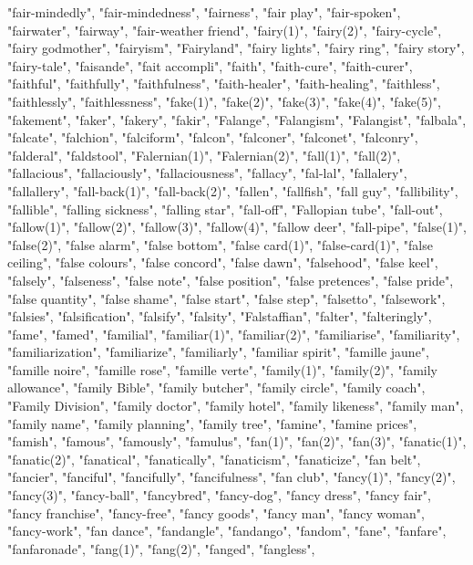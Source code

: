 "fair-mindedly",
"fair-mindedness",
"fairness",
"fair play",
"fair-spoken",
"fairwater",
"fairway",
"fair-weather friend",
"fairy(1)",
"fairy(2)",
"fairy-cycle",
"fairy godmother",
"fairyism",
"Fairyland",
"fairy lights",
"fairy ring",
"fairy story",
"fairy-tale",
"faisande",
"fait accompli",
"faith",
"faith-cure",
"faith-curer",
"faithful",
"faithfully",
"faithfulness",
"faith-healer",
"faith-healing",
"faithless",
"faithlessly",
"faithlessness",
"fake(1)",
"fake(2)",
"fake(3)",
"fake(4)",
"fake(5)",
"fakement",
"faker",
"fakery",
"fakir",
"Falange",
"Falangism",
"Falangist",
"falbala",
"falcate",
"falchion",
"falciform",
"falcon",
"falconer",
"falconet",
"falconry",
"falderal",
"faldstool",
"Falernian(1)",
"Falernian(2)",
"fall(1)",
"fall(2)",
"fallacious",
"fallaciously",
"fallaciousness",
"fallacy",
"fal-lal",
"fallalery",
"fallallery",
"fall-back(1)",
"fall-back(2)",
"fallen",
"fallfish",
"fall guy",
"fallibility",
"fallible",
"falling sickness",
"falling star",
"fall-off",
"Fallopian tube",
"fall-out",
"fallow(1)",
"fallow(2)",
"fallow(3)",
"fallow(4)",
"fallow deer",
"fall-pipe",
"false(1)",
"false(2)",
"false alarm",
"false bottom",
"false card(1)",
"false-card(1)",
"false ceiling",
"false colours",
"false concord",
"false dawn",
"falsehood",
"false keel",
"falsely",
"falseness",
"false note",
"false position",
"false pretences",
"false pride",
"false quantity",
"false shame",
"false start",
"false step",
"falsetto",
"falsework",
"falsies",
"falsification",
"falsify",
"falsity",
"Falstaffian",
"falter",
"falteringly",
"fame",
"famed",
"familial",
"familiar(1)",
"familiar(2)",
"familiarise",
"familiarity",
"familiarization",
"familiarize",
"familiarly",
"familiar spirit",
"famille jaune",
"famille noire",
"famille rose",
"famille verte",
"family(1)",
"family(2)",
"family allowance",
"family Bible",
"family butcher",
"family circle",
"family coach",
"Family Division",
"family doctor",
"family hotel",
"family likeness",
"family man",
"family name",
"family planning",
"family tree",
"famine",
"famine prices",
"famish",
"famous",
"famously",
"famulus",
"fan(1)",
"fan(2)",
"fan(3)",
"fanatic(1)",
"fanatic(2)",
"fanatical",
"fanatically",
"fanaticism",
"fanaticize",
"fan belt",
"fancier",
"fanciful",
"fancifully",
"fancifulness",
"fan club",
"fancy(1)",
"fancy(2)",
"fancy(3)",
"fancy-ball",
"fancybred",
"fancy-dog",
"fancy dress",
"fancy fair",
"fancy franchise",
"fancy-free",
"fancy goods",
"fancy man",
"fancy woman",
"fancy-work",
"fan dance",
"fandangle",
"fandango",
"fandom",
"fane",
"fanfare",
"fanfaronade",
"fang(1)",
"fang(2)",
"fanged",
"fangless",
